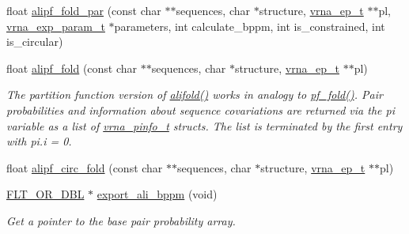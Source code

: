 \begin{DoxyCompactItemize}
\item 
float \mbox{\hyperlink{group__part__func__global__deprecated_gab46954fb0ed3b6d5631e7f9b802978cd}{alipf\+\_\+fold\+\_\+par}} (const char $\ast$$\ast$sequences, char $\ast$structure, \mbox{\hyperlink{group__struct__utils__plist_gab9ac98ab55ded9fb90043b024b915aca}{vrna\+\_\+ep\+\_\+t}} $\ast$$\ast$pl, \mbox{\hyperlink{group__energy__parameters_ga01d8b92fe734df8d79a6169482c7d8d8}{vrna\+\_\+exp\+\_\+param\+\_\+t}} $\ast$parameters, int calculate\+\_\+bppm, int is\+\_\+constrained, int is\+\_\+circular)
\item 
float \mbox{\hyperlink{group__part__func__global__deprecated_ga1a5f6cfb9d761fa862ce4edc7c369cd2}{alipf\+\_\+fold}} (const char $\ast$$\ast$sequences, char $\ast$structure, \mbox{\hyperlink{group__struct__utils__plist_gab9ac98ab55ded9fb90043b024b915aca}{vrna\+\_\+ep\+\_\+t}} $\ast$$\ast$pl)
\begin{DoxyCompactList}\small\item\em The partition function version of \mbox{\hyperlink{group__mfe__global__deprecated_ga4cf00f0659e5f0480335d69e797f05b1}{alifold()}} works in analogy to \mbox{\hyperlink{group__part__func__global__deprecated_gadc3db3d98742427e7001a7fd36ef28c2}{pf\+\_\+fold()}}. Pair probabilities and information about sequence covariations are returned via the \textquotesingle{}pi\textquotesingle{} variable as a list of \mbox{\hyperlink{group__aln__utils_ga6660dfca23debee7306e0cd53341263f}{vrna\+\_\+pinfo\+\_\+t}} structs. The list is terminated by the first entry with pi.\+i = 0. \end{DoxyCompactList}\item 
float \mbox{\hyperlink{group__part__func__global__deprecated_ga604a42ad64178279551ad3e4def3d603}{alipf\+\_\+circ\+\_\+fold}} (const char $\ast$$\ast$sequences, char $\ast$structure, \mbox{\hyperlink{group__struct__utils__plist_gab9ac98ab55ded9fb90043b024b915aca}{vrna\+\_\+ep\+\_\+t}} $\ast$$\ast$pl)
\item 
\mbox{\hyperlink{group__data__structures_ga31125aeace516926bf7f251f759b6126}{F\+L\+T\+\_\+\+O\+R\+\_\+\+D\+BL}} $\ast$ \mbox{\hyperlink{group__part__func__global__deprecated_ga11b6ab8bd9be1821fea352b190a01cab}{export\+\_\+ali\+\_\+bppm}} (void)
\begin{DoxyCompactList}\small\item\em Get a pointer to the base pair probability array. \end{DoxyCompactList}\item 

\end{DoxyCompactItemize}
